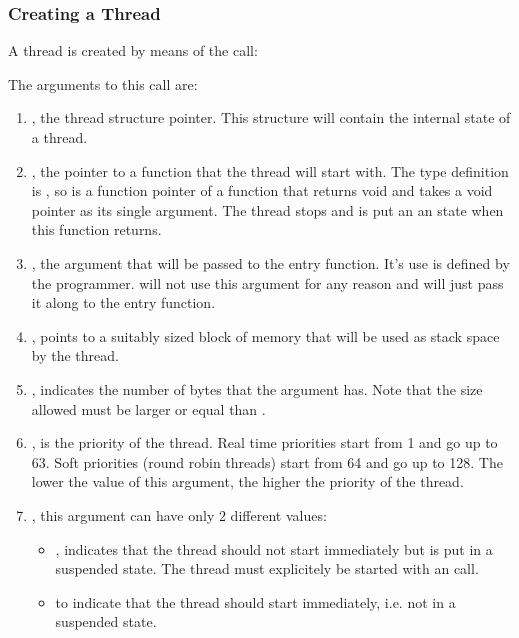 \subsubsection{Creating a Thread}

A thread is created by means of the call:


The arguments to this call are:
\begin{enumerate}
\item {}, the thread structure pointer. This structure will contain the internal state of a thread.

\item {}, the pointer to a function that the thread will start with. The type definition 
is , so 
is a function pointer of a function that returns void and takes a void
pointer as its single argument. The thread stops and is put an an
 state when this function returns.

\item {}, the argument that will be passed to the entry
function. It's use is defined by the programmer. \oswald will not use this
argument for any reason and will just pass it along to the entry function.

\item {}, points to a suitably sized block of memory that will
be used as stack space by the thread.

\item {}, indicates the number of bytes that the 
argument has. Note that the size allowed must be larger or equal than
.

\item {}, is the priority of the thread. Real time priorities start from 1
and go up to 63. Soft priorities (round robin threads) start from 64 and go
up to 128. The lower the value of this  argument, the higher
the priority of the thread.

\item {}, this argument can have only 2 different values:
\begin{itemize}
\item {}, indicates that the thread should not start
immediately but is put in a suspended state. The thread must explicitely be
started with an  call.

\item {} to indicate that the thread should start immediately,
i.e. not in a suspended state.
\end{itemize}

\end{enumerate}

